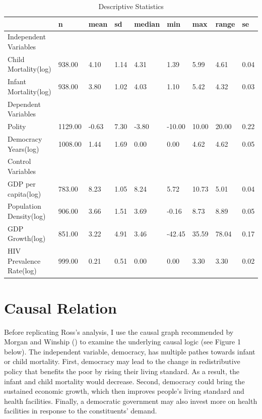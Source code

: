 \documentclass[12pt, lelterpaper, reqno]{article}\usepackage[]{graphicx}\usepackage[]{color}
\begin{document}
\begin{table}[H]
	\centering
	\caption{Descriptive Statistics}
	\begin{tabular}{lllllllll}
		\hline
		& n & mean & sd & median & min & max & range & se \\
		\hline
		Independent Variables &&&&&&&&\\
		\hline
		Child Mortality(log) & 938.00 & 4.10 & 1.14 & 4.31 & 1.39 & 5.99 & 4.61 & 0.04 \\
		Infant Mortality(log) & 938.00 & 3.80 & 1.02 & 4.03 & 1.10 & 5.42 & 4.32 & 0.03 \\
		\hline
		Dependent Variables &&&&&&&&\\
		\hline
		Polity & 1129.00 & -0.63 & 7.30 & -3.80 & -10.00 & 10.00 & 20.00 & 0.22 \\
		Democracy Years(log) & 1008.00 & 1.44 & 1.69 & 0.00 & 0.00 & 4.62 & 4.62 & 0.05 \\
		\hline
		Control Variables &&&&&&&&\\
		\hline
		GDP per capita(log) & 783.00 & 8.23 & 1.05 & 8.24 & 5.72 & 10.73 & 5.01 & 0.04 \\
		Population Density(log) & 906.00 & 3.66 & 1.51 & 3.69 & -0.16 & 8.73 & 8.89 & 0.05 \\
		GDP Growth(log) & 851.00 & 3.22 & 4.91 & 3.46 & -42.45 & 35.59 & 78.04 & 0.17 \\
		HIV Prevalence Rate(log) & 999.00 & 0.21 & 0.51 & 0.00 & 0.00 & 3.30 & 3.30 & 0.02 \\
		\hline
	\end{tabular}
\end{table}

\section{Causal Relation}
Before replicating Ross's analysis, I use the causal graph recommended by Morgan and Winship (\citeyear{morgan2014counterfactuals}) to examine the underlying causal logic (see Figure 1 below). The independent variable, democracy, has multiple pathes towards infant or child mortality. First, democracy may lead to the change in redistributive policy that benefits the poor by rising their living standard. As a result, the infant and child mortality would decrease. Second, democracy could bring the sustained economic growth, which then improves people's living standard and health facilities. Finally, a democratic government may also invest more on health facilities in response to the constituents' demand.
\end{document}
